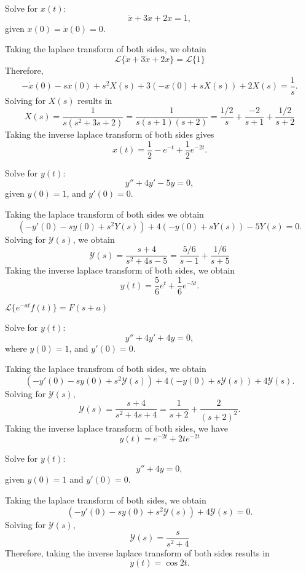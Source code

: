 \begin{example}
    Solve for $x(t)$:
    $$\ddot{x}+3\dot{x}+2x = 1,$$
    given $x(0) = \dot{x}(0) = 0$.
\end{example}
\begin{soln}
    Taking the laplace transform of both sides, we obtain
    $$\mathcal{L}\{\ddot{x}+3\dot{x}+2x\} = \mathcal{L}\{1\}$$
    Therefore, $$-\dot{x}(0)-sx(0)+s^2X(s)+3(-x(0)+sX(s))+2X(s)=\frac{1}{s}.$$
    Solving for $X(s)$ results in 
    $$X(s) = \frac{1}{s(s^2+3s+2)} = \frac{1}{s(s+1)(s+2)} = \frac{1/2}{s}+\frac{-2}{s+1}+\frac{1/2}{s+2}$$
    Taking the inverse laplace transform of both sides gives
    $$x(t) = \frac{1}{2}-e^{-t}+\frac{1}{2}e^{-2t}.$$
\end{soln}

\begin{example}
    Solve for $y(t)$:
    $$y''+4y'-5y=0,$$
    given $y(0)=1$, and $y'(0)=0$.
\end{example}
\begin{soln}
    Taking the laplace transform of both sides we obtain
    $$\left( -y'(0)-sy(0)+s^2Y(s)\right)+4\left( -y(0)+sY(s)\right)-5Y(s)=0.$$
    Solving for $\mathcal{Y}(s)$, we obtain
    $$\mathcal{Y}(s) = \frac{s+4}{s^2+4s-5} = \frac{5/6}{s-1}+\frac{1/6}{s+5}$$
    Taking the inverse laplace transform of both sides, we obtain
    $$y(t) = \frac{5}{6}e^t+\frac{1}{6}e^{-5t}.$$
\end{soln}
\begin{theorem}
    $\mathcal{L}\{e^{-at}f(t)\} = F(s+a)$
\end{theorem}

\begin{example}
    Solve for $y(t)$:
    $$y''+4y'+4y = 0,$$
    where $y(0) = 1$, and $y'(0) = 0$.
\end{example}
\begin{soln}
    Taking the laplace transfrom of both sides, we obtain
    $$\left(-y'(0)-sy(0)+s^2\mathcal{Y}(s)\right)+4\left(-y(0)+s\mathcal{Y}(s)\right)+4\mathcal{Y}(s).$$
    Solving for $\mathcal{Y}(s)$,
    $$\mathcal{Y}(s) = \frac{s+4}{s^2+4s+4} = \frac{1}{s+2}+\frac{2}{(s+2)^2}.$$
    Taking the inverse laplace transform of both sides, we have
    $$y(t) = e^{-2t}+2te^{-2t}$$
\end{soln}

\begin{example}
    Solve for $y(t)$:
    $$y''+4y=0,$$
    given $y(0)=1$ and $y'(0)=0$.
\end{example}
\begin{soln}
    Taking the laplace transform of both sides, we obtain
    $$\left( -y'(0)-sy(0)+s^2\mathcal{Y}(s)\right)+4\mathcal{Y}(s) = 0.$$
    Solving for $\mathcal{Y}(s)$,
    $$\mathcal{Y}(s) = \frac{s}{s^2+4}$$
    Therefore, taking the inverse laplace transform of both sides results in
    $$y(t) = \cos 2t.$$
\end{soln}

